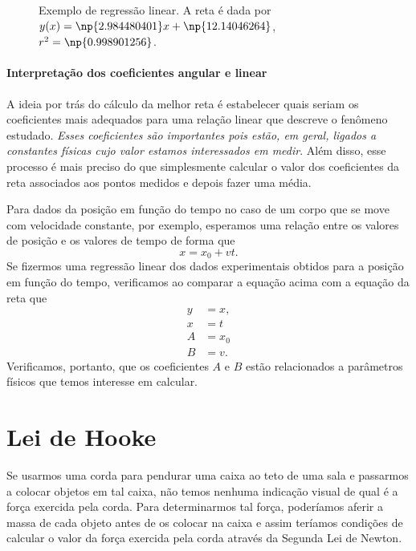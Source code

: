\begin{figure}[!h]
\centering

\caption{Exemplo de regressão linear. A reta é dada por $y(x)=\np{2.984480401}x + \np{12.14046264}$, $r^2 = \np{0.998901256}$.}
\end{figure}

\paragraph{Interpretação dos coeficientes angular e linear}

A ideia por trás do cálculo da melhor reta é estabelecer quais seriam os coeficientes mais adequados para uma relação linear que descreve o fenômeno estudado. \emph{Esses coeficientes são importantes pois estão, em geral, ligados a constantes físicas cujo valor estamos interessados em medir}. Além disso, esse processo é mais preciso do que simplesmente calcular o valor dos coeficientes da reta associados aos pontos medidos e depois fazer uma média.

Para dados da posição em função do tempo no caso de um corpo que se move com velocidade constante, por exemplo, esperamos uma relação entre os valores de posição e os valores de tempo de forma que
\begin{equation}
    x = x_0 + vt.
\end{equation}
%
Se fizermos uma regressão linear dos dados experimentais obtidos para a posição em função do tempo, verificamos ao comparar a equação acima com a equação da reta que
\begin{align}
    y &= x, \\
    x &= t \\
    A &= x_0 \\
    B &= v.
\end{align}
%
Verificamos, portanto, que os coeficientes $A$ e $B$ estão relacionados a parâmetros físicos que temos interesse em calcular.

\section{Lei de Hooke}

Se usarmos uma corda para pendurar uma caixa ao teto de uma sala e passarmos a colocar objetos em tal caixa, não temos nenhuma indicação visual de qual é a força exercida pela corda. Para determinarmos tal força, poderíamos aferir a massa de cada objeto antes de os colocar na caixa e assim teríamos condições de calcular o valor da força exercida pela corda através da Segunda Lei de Newton.

